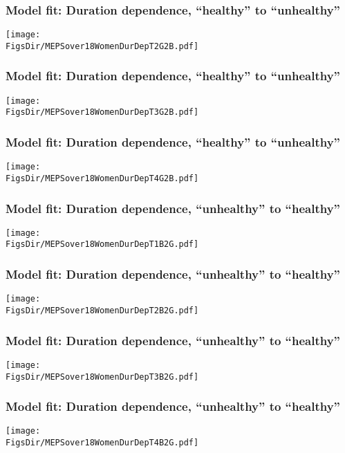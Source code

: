 \documentclass[aspectratio=169]{beamer}
\newcommand{\FigsDir}{../Figures}
\begin{document}
\begin{frame}\frametitle{Model fit: Duration dependence, ``healthy'' to ``unhealthy''}
\begin{center}
	\texttt{[image: \\FigsDir/MEPSover18WomenDurDepT2G2B.pdf]}
\end{center}
\end{frame}

\begin{frame}\frametitle{Model fit: Duration dependence, ``healthy'' to ``unhealthy''}
\begin{center}
	\texttt{[image: \\FigsDir/MEPSover18WomenDurDepT3G2B.pdf]}
\end{center}
\end{frame}

\begin{frame}\frametitle{Model fit: Duration dependence, ``healthy'' to ``unhealthy''}
\begin{center}
	\texttt{[image: \\FigsDir/MEPSover18WomenDurDepT4G2B.pdf]}
\end{center}
\end{frame}

\begin{frame}\frametitle{Model fit: Duration dependence, ``unhealthy'' to ``healthy''}
\begin{center}
	\texttt{[image: \\FigsDir/MEPSover18WomenDurDepT1B2G.pdf]}
\end{center}
\end{frame}

\begin{frame}\frametitle{Model fit: Duration dependence, ``unhealthy'' to ``healthy''}
\begin{center}
	\texttt{[image: \\FigsDir/MEPSover18WomenDurDepT2B2G.pdf]}
\end{center}
\end{frame}

\begin{frame}\frametitle{Model fit: Duration dependence, ``unhealthy'' to ``healthy''}
\begin{center}
	\texttt{[image: \\FigsDir/MEPSover18WomenDurDepT3B2G.pdf]}
\end{center}
\end{frame}

\begin{frame}\frametitle{Model fit: Duration dependence, ``unhealthy'' to ``healthy''}
\begin{center}
	\texttt{[image: \\FigsDir/MEPSover18WomenDurDepT4B2G.pdf]}
\end{center}
\end{frame}
\end{document}
